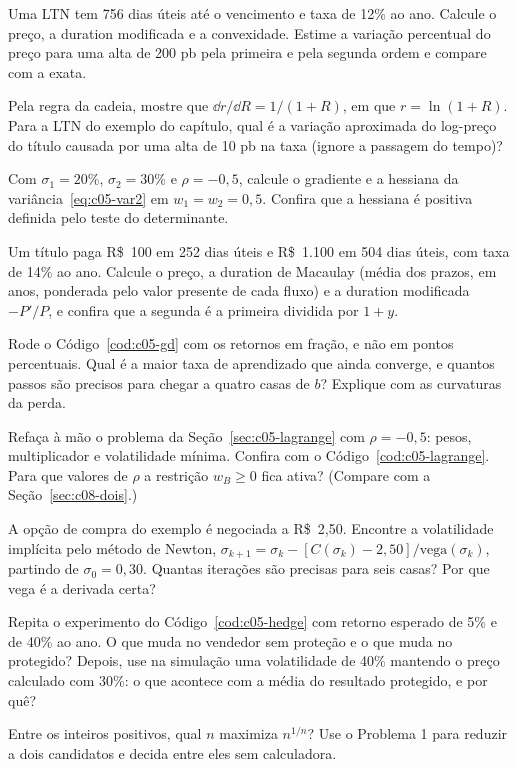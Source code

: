 \begin{exercicios}
  \item {} Uma LTN tem 756 dias úteis até o vencimento e taxa de 12\% ao ano. Calcule o preço, a duration modificada e a convexidade. Estime a variação percentual do preço para uma alta de 200 pb pela primeira e pela segunda ordem e compare com a exata.
  \item {} Pela regra da cadeia, mostre que $\dd r/\dd R = 1/(1+R)$, em que $r = \ln(1+R)$. Para a LTN do exemplo do capítulo, qual é a variação aproximada do log-preço do título causada por uma alta de 10 pb na taxa (ignore a passagem do tempo)?
  \item {} Com $\sigma_1 = 20\%$, $\sigma_2 = 30\%$ e $\rho = -0,5$, calcule o gradiente e a hessiana da variância~\eqref{eq:c05-var2} em $w_1 = w_2 = 0,5$. Confira que a hessiana é positiva definida pelo teste do determinante.
  \item\label{ex:c05-cupom}  Um título paga R\$~100 em 252 dias úteis e R\$~1.100 em 504 dias úteis, com taxa de 14\% ao ano. Calcule o preço, a duration de Macaulay (média dos prazos, em anos, ponderada pelo valor presente de cada fluxo) e a duration modificada $-P'/P$, e confira que a segunda é a primeira dividida por $1 + y$.
  \item {} Rode o Código~\ref{cod:c05-gd} com os retornos em fração, e não em pontos percentuais. Qual é a maior taxa de aprendizado que ainda converge, e quantos passos são precisos para chegar a quatro casas de $b$? Explique com as curvaturas da perda.
  \item {} Refaça à mão o problema da Seção~\ref{sec:c05-lagrange} com $\rho = -0,5$: pesos, multiplicador e volatilidade mínima. Confira com o Código~\ref{cod:c05-lagrange}. Para que valores de $\rho$ a restrição $w_B \ge 0$ fica ativa? (Compare com a Seção~\ref{sec:c08-dois}.)
  \item {} A opção de compra do exemplo é negociada a R\$~2,50. Encontre a volatilidade implícita pelo método de Newton, $\sigma_{k+1} = \sigma_k - [C(\sigma_k) - 2,50]/\text{vega}(\sigma_k)$, partindo de $\sigma_0 = 0,30$. Quantas iterações são precisas para seis casas? Por que vega é a derivada certa?
  \item\label{ex:c05-hedge}  Repita o experimento do Código~\ref{cod:c05-hedge} com retorno esperado de 5\% e de 40\% ao ano. O que muda no vendedor sem proteção e o que muda no protegido? Depois, use na simulação uma volatilidade de 40\% mantendo o preço calculado com 30\%: o que acontece com a média do resultado protegido, e por quê?
  \item {} Entre os inteiros positivos, qual $n$ maximiza $n^{1/n}$? Use o Problema 1 para reduzir a dois candidatos e decida entre eles sem calculadora.
\end{exercicios}

